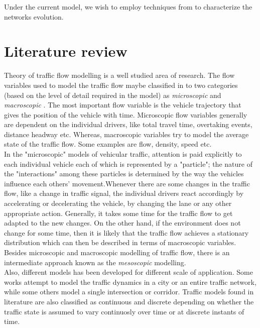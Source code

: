\documentclass[a4paper,12pt]{scrartcl}
\begin{document}
Under the current model, we wish to employ techniques from \cite{ChengCoRR2017} to characterize the networks evolution. 

\section{Literature review}
Theory of traffic flow modelling is a well studied area of research. 
The flow variables used to model the traffic flow maybe classified in to two categories (based on the level of detail required in the model) as \emph{microscopic} and \emph{macroscopic} \cite{hoogendoorn2001JSCE}.
The most important flow variable is the vehicle trajectory that gives the position of the vehicle with time.
Microscopic flow variables generally are dependent on the individual drivers, like total travel time, overtaking events, distance headway etc. Whereas, macroscopic variables try to model the average state of the traffic flow. Some examples are flow, density, speed etc.\\ 

In the "microscopic" models of vehicular traffic, attention is paid explicitly to each individual
vehicle each of which is represented by a "particle"; the nature of the "interactions" among these particles is determined by the way the vehicles influence each others’ movement.Whenever there are some changes in the traffic flow, like a change in traffic signal, the individual drivers react accordingly by accelerating or decelerating the vehicle, by changing the lane or any other appropriate action. Generally, it takes some time for the traffic flow to get adapted to the new changes. On the other hand, if the environment does not change for some time, then it is likely that the traffic flow achieves a stationary distribution which can then be described in terms of macroscopic variables. Besides microscopic and macroscopic modelling of traffic flow, there is an intermediate approach known as the \emph{mesoscopic} modelling.\\

Also, different models has been developed for different scale of application. Some works attempt to model the traffic dynamics in a city or an entire traffic network, while some others model a single intersection or corridor. Traffic models found in literature are also classified as continuous and discrete depending on whether the traffic state is assumed to vary continuosly over time or at discrete instants of time.\\
\end{document}
